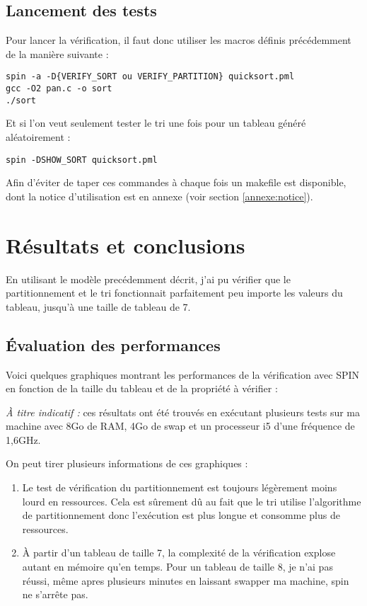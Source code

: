 \documentclass[french]{article}
\begin{document}
\subsection{Lancement des tests}
Pour lancer la vérification, il faut donc utiliser les macros définis précédemment de la manière
suivante :
\begin{verbatim}
spin -a -D{VERIFY_SORT ou VERIFY_PARTITION} quicksort.pml
gcc -O2 pan.c -o sort
./sort
\end{verbatim}

Et si l'on veut seulement tester le tri une fois pour un tableau généré aléatoirement :
\begin{verbatim}
spin -DSHOW_SORT quicksort.pml
\end{verbatim}

Afin d'éviter de taper ces commandes à chaque fois un makefile est disponible, dont la notice
d'utilisation est en annexe (voir section \ref{annexe:notice}).

\newpage

\section{Résultats et conclusions}
En utilisant le modèle precédemment décrit, j'ai pu vérifier que le partitionnement et le tri
fonctionnait parfaitement peu importe les valeurs du tableau, jusqu'à une taille de tableau de 7.

\subsection{Évaluation des performances}
Voici quelques graphiques montrant les performances de la vérification avec SPIN en fonction
de la taille du tableau et de la propriété à vérifier :



\emph{À titre indicatif :} ces résultats ont été trouvés en exécutant plusieurs tests sur ma machine
avec 8Go de RAM, 4Go de swap et un processeur i5 d'une fréquence de 1,6GHz.\newline

On peut tirer plusieurs informations de ces graphiques :
\begin{enumerate}
    \item Le test de vérification du partitionnement est toujours légèrement moins lourd en
        ressources. Cela est sûrement dû au fait que le tri utilise l'algorithme de partitionnement
        donc l'exécution est plus longue et consomme plus de ressources.

    \item À partir d'un tableau de taille 7, la complexité de la vérification explose autant en
        mémoire qu'en temps. Pour un tableau de taille 8, je n'ai pas réussi, même apres plusieurs
        minutes en laissant swapper ma machine, spin ne s'arrête pas.
\end{enumerate}
\end{document}
